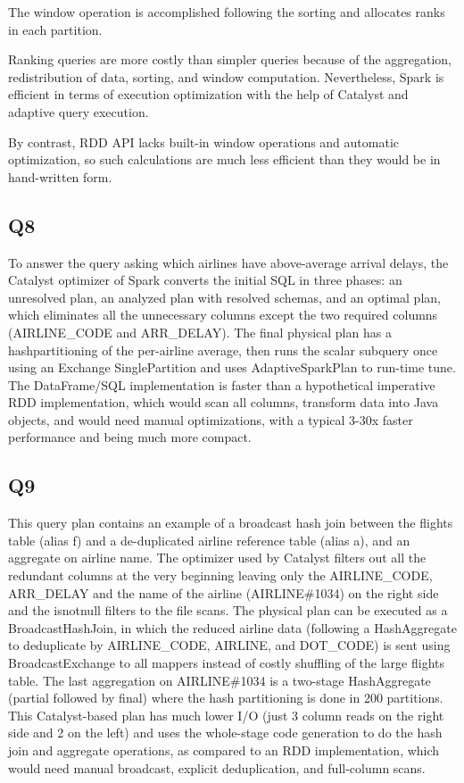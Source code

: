 \documentclass{article}
\begin{document}
The window operation is accomplished following the sorting and allocates ranks in each partition.

Ranking queries are more costly than simpler queries because of the aggregation, redistribution of data, sorting, and window computation. Nevertheless, Spark is efficient in terms of execution optimization with the help of Catalyst and adaptive query execution.

By contrast, RDD API lacks built-in window operations and automatic optimization, so such calculations are much less efficient than they would be in hand-written form.
\subsection{Q8}
To answer the query asking which airlines have above-average arrival delays, the Catalyst optimizer of Spark converts the initial SQL in three phases: an unresolved plan, an analyzed plan with resolved schemas, and an optimal plan, which eliminates all the unnecessary columns except the two required columns (AIRLINE\_CODE and ARR\_DELAY). The final physical plan has a hashpartitioning of the per-airline average, then runs the scalar subquery once using an Exchange SinglePartition and uses AdaptiveSparkPlan to run-time tune. The DataFrame/SQL implementation is faster than a hypothetical imperative RDD implementation, which would scan all columns, transform data into Java objects, and would need manual optimizations, with a typical 3-30x faster performance and being much more compact.
\subsection{Q9}
This query plan contains an example of a broadcast hash join between the flights table (alias f) and a de-duplicated airline reference table (alias a), and an aggregate on airline name. The optimizer used by Catalyst filters out all the redundant columns at the very beginning leaving only the AIRLINE\_CODE, ARR\_DELAY and the name of the airline (AIRLINE\#1034) on the right side and the isnotnull filters to the file scans. The physical plan can be executed as a BroadcastHashJoin, in which the reduced airline data (following a HashAggregate to deduplicate by AIRLINE\_CODE, AIRLINE, and DOT\_CODE) is sent using BroadcastExchange to all mappers instead of costly shuffling of the large flights table. The last aggregation on AIRLINE\#1034 is a two-stage HashAggregate (partial followed by final) where the hash partitioning is done in 200 partitions. This Catalyst-based plan has much lower I/O (just 3 column reads on the right side and 2 on the left) and uses the whole-stage code generation to do the hash join and aggregate operations, as compared to an RDD implementation, which would need manual broadcast, explicit deduplication, and full-column scans.
\end{document}
